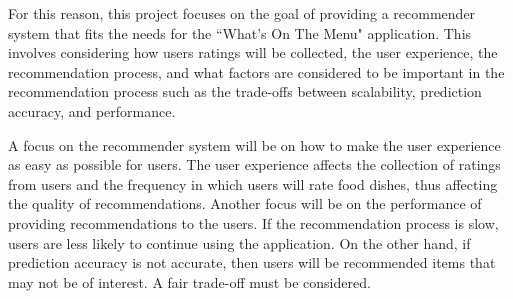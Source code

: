 For this reason, this project focuses on the goal of providing a recommender system that fits the needs for the ``What's On The Menu" application. This involves considering how users ratings will be collected, the user experience, the recommendation process, and what factors are considered to be important in the recommendation process such as the trade-offs between scalability, prediction accuracy, and performance.

A focus on the recommender system will be on how to make the user experience as easy as possible for users. The user experience affects the collection of ratings from users and the frequency in which users will rate food dishes, thus affecting the quality of recommendations. Another focus will be on the performance of providing recommendations to the users.  If the recommendation process is slow, users are less likely to continue using the application. On the other hand, if prediction accuracy is not accurate, then users will be recommended items that may not be of interest. A fair trade-off must be considered. 





